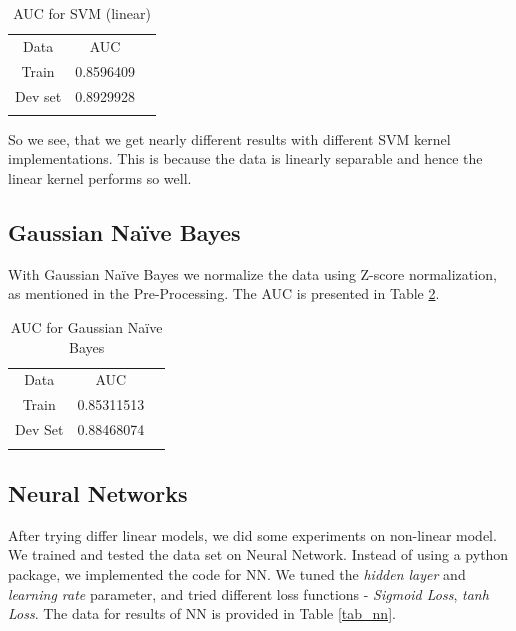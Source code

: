 \documentclass[conference]{IEEEtran}
\numberwithin{equation}{section}
\numberwithin{figure}{section}
\numberwithin{table}{section}
\begin{document}
\begin{table}[!htb]
 \centering
 \caption{AUC for SVM (linear)}
 \label{tab_svm}
\begin{tabular}{ c c c } 
	    \noalign{\smallskip}\hline\noalign{\smallskip}
		Data &   AUC \\
    	   \noalign{\smallskip}\hline\noalign{\smallskip}
		Train & 0.8596409\\
		Dev set & 0.8929928\\
			    \noalign{\smallskip}\hline\noalign{\smallskip}
  \end{tabular} 
\end{table}

So we see, that we get nearly different results with different SVM kernel implementations. This is because the data is linearly separable and hence the linear kernel performs so well.

\subsection{Gaussian Na{\"i}ve Bayes}
With Gaussian Na{\"i}ve Bayes we normalize the data using Z-score normalization, as mentioned in the Pre-Processing. The AUC is presented in Table \ref{nb_tab}.

\begin{table}[!htb]
 \centering
 \caption{AUC for Gaussian Na{\"i}ve Bayes}
 \label{nb_tab}
\begin{tabular}{ c c c } 
	    \noalign{\smallskip}\hline\noalign{\smallskip}
		Data & AUC \\
    	   \noalign{\smallskip}\hline\noalign{\smallskip}
		Train &  0.85311513\\
		Dev Set & 0.88468074\\
		\noalign{\smallskip}\hline\noalign{\smallskip}
  \end{tabular} 
\end{table}

\subsection{Neural Networks}
After trying differ linear models, we did some experiments on non-linear model. We trained and tested the data set on Neural Network. Instead of using a python package, we implemented the code for NN. We tuned the \textit{hidden layer} and \textit{learning rate} parameter,  and tried different loss functions - \textit{Sigmoid Loss}, \textit{tanh Loss}. The data for results of NN is provided in Table \ref{tab_nn}.
\end{document}
